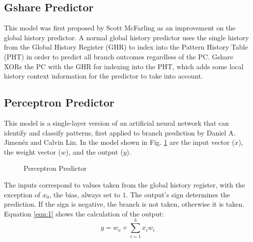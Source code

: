 \documentclass[conference]{IEEEtran}
\begin{document}
\subsection{Gshare Predictor} \label{ssec:gshare}
This model was first proposed by Scott McFarling as an improvement on the global history predictor\cite{mcfarling1993}. A normal global history predictor uses the single history from the Global History Register (GHR) to index into the Pattern History Table (PHT) in order to predict all branch outcomes regardless of the PC. Gshare XORs the PC with the GHR for indexing into the PHT, which adds some local history context information for the predictor to take into account.

\subsection{Perceptron Predictor} \label{ssec:perceptron}
This model is a single-layer version of an artificial neural network that can identify and classify patterns, first applied to branch prediction by Daniel A. Jimen\'ez and Calvin Lin\cite{jimenez2001dynamic}. In the model shown in Fig. \ref{fig:perceptron} are the input vector ($x$), the weight vector ($w$), and the output ($y$).
\begin{figure}
    \centering
    \caption{Perceptron Predictor}
	\label{fig:perceptron}
\end{figure}
The inputs correspond to values taken from the global history register, with the exception of $x_0$, the bias, always set to $1$. The output's sign determines the prediction. If the sign is negative, the branch is not taken, otherwise it is taken. Equation \eqref{eqn:1} shows the calculation of the output:
\begin{equation}
    y = w_o + \sum_{i=1}^{h}{x_iw_i}
    \label{eqn:1}
\end{equation}
\end{document}
